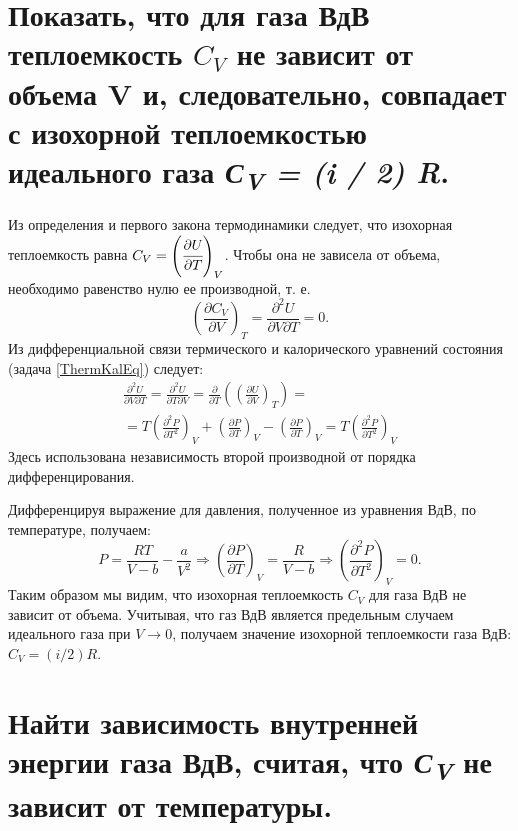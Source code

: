 \section{Показать, что для газа ВдВ теплоемкость $C_V$ не зависит от объема V и,
следовательно, совпадает с изохорной теплоемкостью идеального газа
\emph{С\textsubscript{V} = (i / 2) R}.}

\solving{}

Из определения и первого закона термодинамики следует, что изохорная
теплоемкость равна $C_V = \left ( \cfrac{\partial U}{\partial T} \right )_V$. Чтобы она не
зависела от объема, необходимо равенство нулю ее производной, т. е.
\begin{equation}
  \left ( \frac{\partial C_V}{\partial V} \right )_T = \frac{\partial^2 U}{\partial V \partial T} =0.
\end{equation}
Из дифференциальной связи термического и калорического уравнений
состояния (задача \ref{ThermKalEq}) следует:
\begin{eqnarray}
  \frac{\partial^2 U}{\partial V \partial T} = \frac{\partial^2 U}{\partial T \partial V} = \frac{\partial}{\partial T} \left ( \left (\frac{\partial U}{\partial V}\right )_T \right ) = \nonumber \\
  = T \left (\frac{\partial^2 P}{\partial T^2}\right )_V + \left (\frac{\partial P}{\partial T}\right )_V - \left (\frac{\partial P}{\partial T}\right )_V = T \left (\frac{\partial^2 P}{\partial T^2}\right )_V
\end{eqnarray}
Здесь использована независимость второй производной от порядка
дифференцирования.

Дифференцируя выражение для давления, полученное из уравнения ВдВ, по
температуре, получаем:
\begin{equation}
  P = \frac{RT}{V-b} - \frac{a}{V^2} \Rightarrow \left (\frac{\partial P}{\partial T} \right )_V = \frac{R}{V-b} \Rightarrow \left (\frac{\partial^2 P}{\partial T^2} \right )_V = 0.
\end{equation}
Таким образом мы видим, что изохорная теплоемкость $C_V$ для газа ВдВ не зависит от объема. Учитывая, что газ ВдВ является предельным случаем идеального газа при $V \rightarrow
0$, получаем значение изохорной теплоемкости газа ВдВ:
$C_V = (i/2) R$.

\section{Найти зависимость внутренней энергии газа ВдВ, считая, что
\emph{С\textsubscript{V}} не зависит от температуры.}

